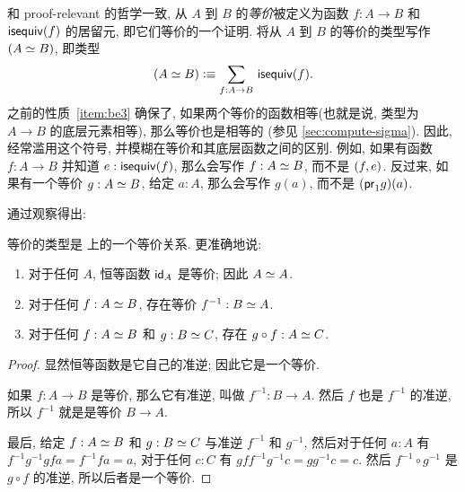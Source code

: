 和 proof-relevant 的哲学一致,
%
从 $A$ 到 $B$ 的\emph{等价}被定义为函数 $f:A\to B$ 和 $\isequiv (f)$ 的居留元, 即它们等价的一个证明.
将从 $A$ 到 $B$ 的等价的类型写作 $(\eqv A B)$, 即类型
\begin{equation}
    \label{eq:eqv}
    (\eqv A B) \defeq \sm{f:A\to B} \isequiv(f).
\end{equation}
之前的性质~\ref{item:be3} 确保了, 如果两个等价的函数相等(也就是说, 类型为 $A\to B$ 的底层元素相等), 那么等价也是相等的 (参见 \cref{sec:compute-sigma}).
因此, 经常滥用这个符号, 并模糊在等价和其底层函数之间的区别.
例如, 如果有函数 $f:A\to B$ 并知道 $e:\isequiv(f)$, 那么会写作 $f:\eqv A B$, 而不是 $\tup{f}{e}$.
反过来, 如果有一个等价 $g:\eqv A B$, 给定 $a:A$, 那么会写作 $g(a)$, 而不是 $(\proj1 g)(a)$.

通过观察得出:

\begin{lem}
    \label{thm:equiv-eqrel}
    等价的类型是 \type 上的一个等价关系.
    更准确地说:
    \begin{enumerate}
        \item 对于任何 $A$, 恒等函数 $\idfunc[A]$ 是等价; 因此 $\eqv A A$.
        \item 对于任何 $f:\eqv A B$, 存在等价 $f^{-1} : \eqv B A$.
        \item 对于任何 $f:\eqv A B$ 和 $g:\eqv B C$, 存在 $g\circ f : \eqv A C$.
    \end{enumerate}
\end{lem}
\begin{proof}
    显然恒等函数是它自己的准逆; 因此它是一个等价.

    如果 $f:A\to B$ 是等价, 那么它有准逆, 叫做 $f^{-1}:B\to A$.
    然后 $f$ 也是 $f^{-1}$ 的准逆, 所以 $f^{-1}$ 就是是等价 $B\to A$.

    最后, 给定 $f:\eqv A B$ 和 $g:\eqv B C$ 与准逆 $f^{-1}$ 和 $g^{-1}$, 然后对于任何 $a:A$ 有 $f^{-1} g^{-1} g f a = f^{-1} f a = a$, 对于任何 $c:C$ 有 $g f f^{-1} g^{-1} c = g g^{-1} c = c$.
    然后 $f^{-1} \circ g^{-1}$ 是 $g\circ f$ 的准逆, 所以后者是一个等价.
\end{proof}

%